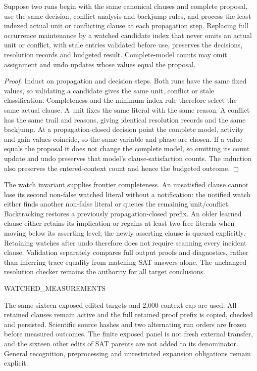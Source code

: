 \begin{proposition}
Suppose two runs begin with the same canonical clauses and complete proposal,
use the same decision, conflict-analysis and backjump rules, and process the
least-indexed actual unit or conflicting clause at each propagation step.
Replacing full occurrence maintenance by a watched candidate index that never
omits an actual unit or conflict, with stale entries validated before use,
preserves the decisions, resolution records and budgeted result.  Complete-model
counts may omit assignment and undo updates whose values equal the proposal.
\end{proposition}
\begin{proof}
Induct on propagation and decision steps.  Both runs have the same fixed values,
so validating a candidate gives the same unit, conflict or stale classification.
Completeness and the minimum-index rule therefore select the same actual clause.
A unit fixes the same literal with the same reason.  A conflict has the same
trail and reasons, giving identical resolution records and the same backjump.
At a propagation-closed decision point the complete model, activity and gain
values coincide, so the same variable and phase are chosen.  If a value equals
the proposal it does not change the complete model, so omitting its count update
and undo preserves that model's clause-satisfaction counts.  The induction also
preserves the entered-context count and hence the budgeted outcome.
\end{proof}

The watch invariant supplies frontier completeness.  An unsatisfied clause
cannot lose its second non-false watched literal without a notification: the
notified watch either finds another non-false literal or queues the remaining
unit/conflict.  Backtracking restores a previously propagation-closed prefix.
An older learned clause either retains its implication or regains at least two
free literals when moving below its asserting level; the newly asserting clause
is queued explicitly.  Retaining watches after undo therefore does not require
scanning every incident clause.  Validation separately compares full output
proofs and diagnostics, rather than inferring trace equality from matching SAT
answers alone.  The unchanged resolution checker remains the authority for
all target conclusions.

WATCHED_MEASUREMENTS

The same sixteen exposed edited targets and 2,000-context cap are used.  All
retained clauses remain active and the full retained proof prefix is copied,
checked and persisted.  Scientific source hashes and two alternating run orders
are frozen before measured outcomes.  The finite exposed panel is not fresh
external transfer, and the sixteen other edits of SAT parents are not added to
its denominator.  General recognition, preprocessing and unrestricted expansion
obligations remain explicit.

